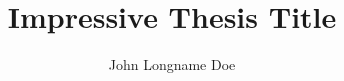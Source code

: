 \documentclass[
  doctype=phd,      %
  school=unl/fct,    %
  docstyle=elegant, %
	lang=en,          %
  coverlang=pt,     %
	linkscolor=darkblue,  %
	spine=false,			%
	biblatex={        %
		style=numeric,  %
		sorting=nyt,		%
		firstinits=true,  %
		sortcites=true, %
	},
	memoir={a4paper, 11pt, draft},	%
]{unlthesis}
\title{Impressive Thesis Title}
\author[m]{John Longname Doe}
\begin{document}
\thesisfrontmatter	%

\coverpage		%
\printcopyright		%
\printdedicatory	%
\printacknowledgements	%
\printquote		%
\printabstract		%
\tableofcontents* 	%
\printotherlists 	%


\thesismainmatter	%

\printchapthers		%
\printbib		%
\printappendixes	%

\end{document}

